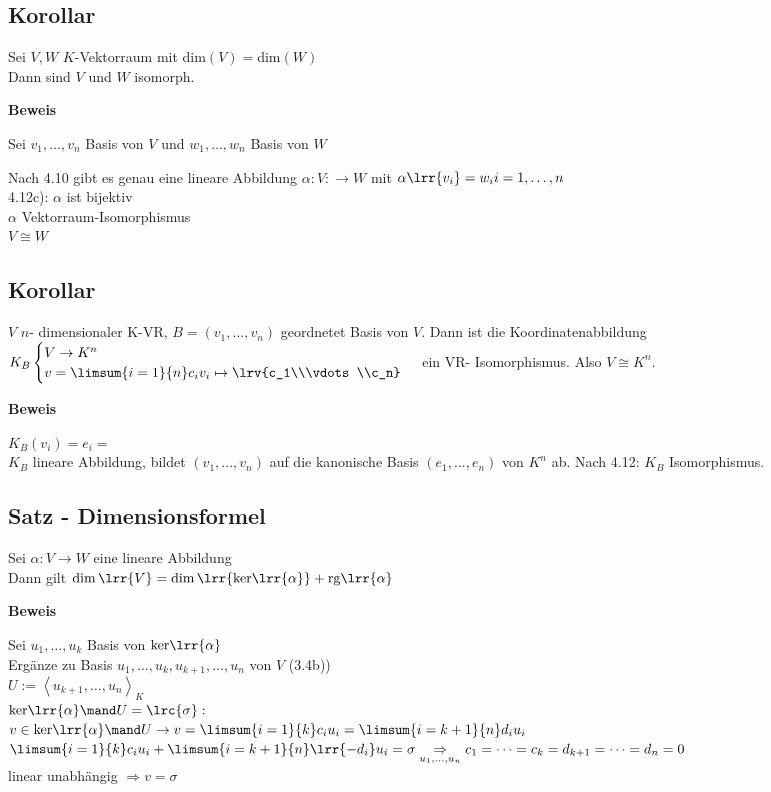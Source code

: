 \subsection{Korollar}
	Sei $V,W$ $K$-Vektorraum mit dim$(V)=$dim$(W)$\\
	Dann sind $V$ und $W$ isomorph.

	\textbf{Beweis}

	Sei $v_1,\dots,v_n$ Basis von $V$ und $w_1,\dots,w_n$ Basis von $W$

	Nach 4.10 gibt es genau eine lineare Abbildung $\alpha:V:\rightarrow W$ mit $\alpha\lrr{v_i}=w_i i=1,\dots,n$\\
	4.12c): $\alpha$ ist bijektiv\\
	$\alpha$ Vektorraum-Isomorphismus\\
	$V\cong W$

\subsection{Korollar}
  $V$ $n$- dimensionaler K-VR, $B=(v_1,...,v_n)$ geordnetet Basis von $V$. Dann
ist die Koordinatenabbildung $K_B\begin{cases}V\rightarrow
K^n\\v=\limsum{i=1}{n}c_iv_i\mapsto\lrv{c_1\\\vdots\\c_n}\end{cases}$ ein VR-
Isomorphismus. Also $V\cong K^n$.

  \textbf{Beweis}

  $K_B(v_i)=e_i=$\\
  $K_B$ lineare Abbildung, bildet $(v_1,...,v_n)$ auf die kanonische Basis
  $(e_1,...,e_n)$ von $K^n$ ab. Nach 4.12: $K_B$ Isomorphismus.

\subsection{Satz - Dimensionsformel}
	Sei $\alpha:V\rightarrow W$ eine lineare Abbildung\\
	Dann gilt $\dim\lrr{V}=\dim\lrr{\mbox{ker}\lrr{\alpha}}+\mbox{rg}\lrr{\alpha}$

	\textbf{Beweis}

	Sei $u_1,\dots,u_k$ Basis von $\mbox{ker}\lrr{\alpha}$\\
	Ergänze zu Basis $u_1,\dots,u_k,u_{k+1},\dots,u_n$ von $V$ (3.4b))\\
	$U:=\left\langle u_{k+1},\dots,u_n\right\rangle_K$\\
	$\mbox{ker}\lrr{\alpha}\mand U=\lrc{\sigma}:$\\
	$v\in\mbox{ker}\lrr{\alpha}\mand U\rightarrow v=\limsum{i=1}{k}c_iu_i=\limsum{i=k+1}{n}d_iu_i$\\
	$\limsum{i=1}{k}c_iu_i+\limsum{i=k+1}{n}\lrr{-d_i}u_i=\sigma\underset{\scriptstyle u_1,\dots,u_n}{\Rightarrow} c_1=\dots=c_k=d_{k+1}=\dots=d_n=0$\\
	linear unabhängig $\Rightarrow v=\sigma$

